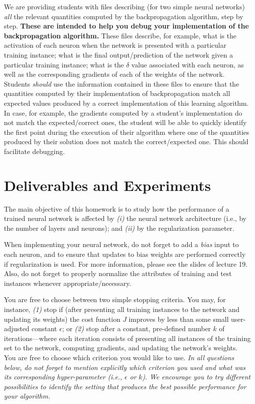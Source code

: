 \documentclass[letterpaper]{article}
\begin{document}
We are providing students with files describing (for two simple neural networks) \textit{all} the relevant quantities computed by the backpropagation algorithm, step by step. \textbf{These are intended to help you debug your implementation of the backpropagation algorithm.} These files describe, for example, what is the activation of each neuron when the network is presented with a particular training instance; what is the final output/prediction of the network given a particular training instance; what is the $\delta$ value associated with each neuron, as well as the corresponding gradients of each of the weights of the network. Students \textit{should} use the information contained in these files to ensure that the quantities computed by their implementation of backpropagation match all expected values produced by a correct implementation of this learning algorithm. In case, for example, the gradients computed by a student's implementation do not match the expected/correct ones, the student will be able to quickly identify the first point during the execution of their algorithm where one of the quantities produced by their solution does not match the correct/expected one. This should facilitate debugging.


\section{Deliverables and Experiments}

The main objective of this homework is to study how the performance of a trained neural network is affected by \textit{(i)} the neural network architecture (i.e., by the number of layers and neurons); and \textit{(ii)} by the regularization parameter. 

When implementing your neural network, do not forget to add a \textit{bias} input to each neuron, and to ensure that updates to bias weights are performed correctly if regularization is used. For more information, please see the slides of lecture 19. Also, do not forget to properly normalize the attributes of training and test instances whenever appropriate/necessary. 

You are free to choose between two simple stopping criteria. You may, for instance, \textit{(1)} stop if (after presenting all training instances to the network and updating its weights) the cost function $J$ improves by less than some small user-adjusted constant $\epsilon$; or  \textit{(2)} stop after a constant, pre-defined number $k$ of iterations---where each iteration consists of presenting all instances of the training set to the network, computing gradients, and updating the network's weights. You are free to choose which criterion you would like to use. \textit{In all questions below, do not forget to mention explicitly which criterion you used and what was its corresponding hyper-parameter (i.e., $\epsilon$ or $k$). We encourage you to try different possibilities to identify the setting that produces the best possible performance for your algorithm.}
\end{document}
